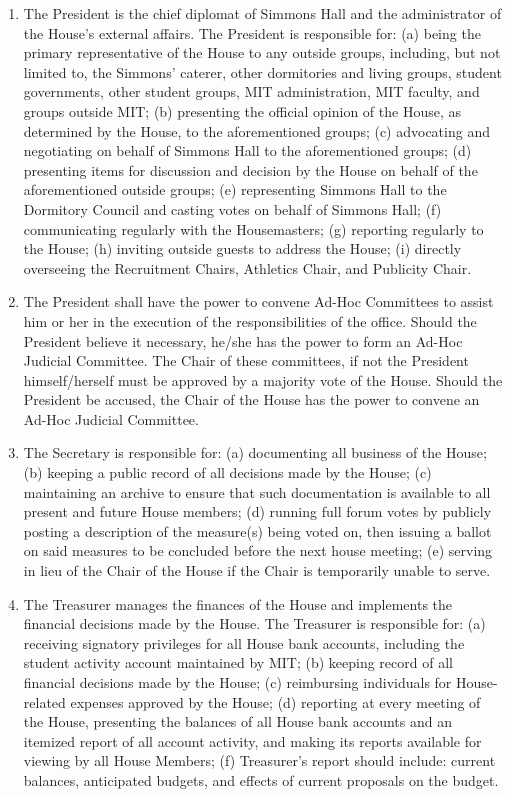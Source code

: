 \documentclass[letterpaper]{article}
\begin{document}
\begin{enumerate}
\begin{enumerate}
\begin{enumerate}
\item The President is the chief diplomat of Simmons Hall and the administrator of the House's external affairs. The President is responsible for: (a) being the primary representative of the House to any outside groups, including, but not limited to, the Simmons' caterer, other dormitories and living groups, student governments, other student groups, MIT administration, MIT faculty, and groups outside MIT; (b) presenting the official opinion of the House, as determined by the House, to the aforementioned groups; (c) advocating and negotiating on behalf of Simmons Hall to the aforementioned groups; (d) presenting items for discussion and decision by the House on behalf of the aforementioned outside groups; (e) representing Simmons Hall to the Dormitory Council and casting votes on behalf of Simmons Hall; (f) communicating regularly with the Housemasters; (g) reporting regularly to the House; (h) inviting outside guests to address the House; (i) directly overseeing the Recruitment Chairs, Athletics Chair, and Publicity Chair.

\item The President shall have the power to convene Ad-Hoc Committees to assist him or her in the execution of the responsibilities of the office. Should the President believe it necessary, he/she has the power to form an Ad-Hoc Judicial Committee. The Chair of these committees, if not the President himself/herself must be approved by a majority vote of the House. Should the President be accused, the Chair of the House has the power to convene an Ad-Hoc Judicial Committee.

\item The Secretary is responsible for: (a) documenting all business of the House; (b) keeping a public record of all decisions made by the House; (c) maintaining an archive to ensure that such documentation is available to all present and future House members; (d) running full forum votes by publicly posting a description of the measure(s) being voted on, then issuing a ballot on said measures to be concluded before the next house meeting; (e) serving in lieu of the Chair of the House
if the Chair is temporarily unable to serve.

\item The Treasurer manages the finances of the House and implements the financial decisions made by the House. The Treasurer is responsible for: (a) receiving signatory privileges for all House bank accounts, including the student activity account maintained by MIT; (b) keeping record of all financial decisions made by the House; (c) reimbursing individuals for House-related expenses approved by the House; (d) reporting at every meeting of the House, presenting the balances of all
House bank accounts and an itemized report of all account activity, and making its reports available for viewing by all House Members; (f) Treasurer's report should include: current balances, anticipated budgets, and effects of current proposals on the budget.


\end{enumerate}
\end{enumerate}
\end{enumerate}
\end{document}

